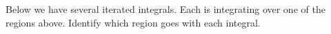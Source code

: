 \documentclass{ximera}
\begin{document}
\begin{problem}
\begin{center}
  \end{center}
  Below we have several iterated integrals. Each is integrating over one
  of the regions above. Identify which region goes with each integral.
  \begin{itemize}

\end{itemize}
\end{problem}
\end{document}
